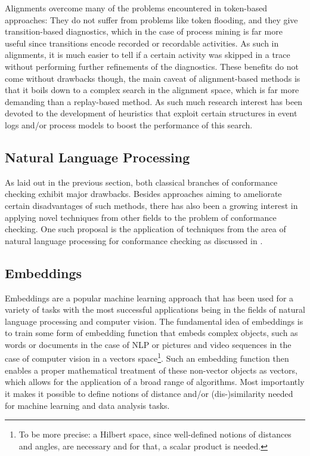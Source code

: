 \documentclass[runningheads]{template/llncs}
\begin{document}

Alignments overcome many of the problems encountered in token-based approaches: 
They do not suffer from problems like token flooding, and they give transition-based diagnostics, which in the case of process mining is far more useful since transitions encode recorded or recordable activities. 
As such in alignments, it is much easier to tell if a certain activity was skipped in a trace without performing further refinements of the diagnostics.
These benefits do not come without drawbacks though, the main caveat of alignment-based methods is that it boils down to a complex search in the alignment space, which is far more demanding than a replay-based method.
As such much research interest has been devoted to the development of heuristics that exploit certain  structures in event logs and/or process models to boost the performance of this search.

\subsection{Natural Language Processing}
\label{sub:nlp}
As laid out in the previous section, both classical branches of conformance checking exhibit major drawbacks.
Besides approaches aiming to ameliorate certain disadvantages of such methods, there has also been a growing interest in applying novel techniques from other fields to the problem of conformance checking.
One such proposal is the application of techniques from the area of natural language processing for conformance checking as discussed in \cite{PBWe20}.

\subsection{Embeddings}
Embeddings are a popular machine learning approach that has been used for a variety of tasks with the most successful applications being in the fields of natural language processing and computer vision.
The fundamental idea of embeddings is to train some form of embedding function that embeds complex objects, such as words or documents in the case of NLP or pictures and video sequences in the case of computer vision in a vectors space\footnote{To be more precise: a Hilbert space, since well-defined notions of distances and angles, are necessary and for that, a scalar product  is needed.}.
Such an embedding function then enables a proper mathematical treatment of these non-vector objects as vectors, which allows for the application of a broad range of algorithms.
Most importantly it makes it possible to define notions of distance and/or (dis-)similarity needed for machine learning and data analysis tasks.
\end{document}

